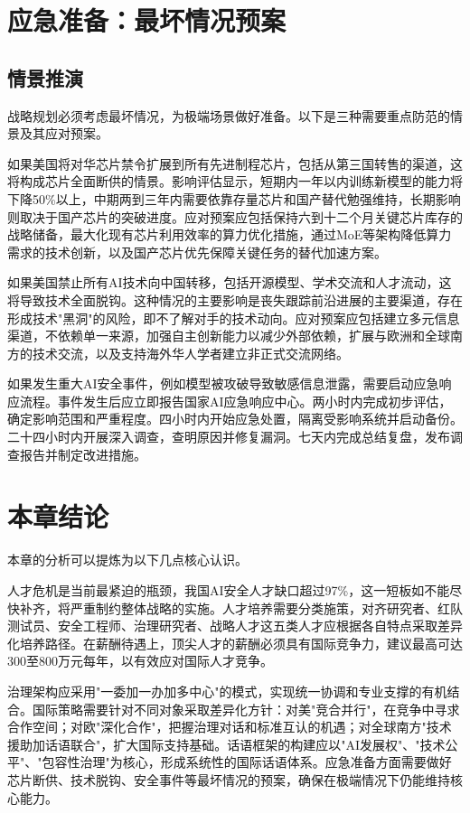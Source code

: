 \section{应急准备：最坏情况预案}

\subsection{情景推演}

战略规划必须考虑最坏情况，为极端场景做好准备。以下是三种需要重点防范的情景及其应对预案。

如果美国将对华芯片禁令扩展到所有先进制程芯片，包括从第三国转售的渠道，这将构成芯片全面断供的情景。影响评估显示，短期内一年以内训练新模型的能力将下降50\%以上，中期两到三年内需要依靠存量芯片和国产替代勉强维持，长期影响则取决于国产芯片的突破进度。应对预案应包括保持六到十二个月关键芯片库存的战略储备，最大化现有芯片利用效率的算力优化措施，通过MoE等架构降低算力需求的技术创新，以及国产芯片优先保障关键任务的替代加速方案。

如果美国禁止所有AI技术向中国转移，包括开源模型、学术交流和人才流动，这将导致技术全面脱钩。这种情况的主要影响是丧失跟踪前沿进展的主要渠道，存在形成技术"黑洞"的风险，即不了解对手的技术动向。应对预案应包括建立多元信息渠道，不依赖单一来源，加强自主创新能力以减少外部依赖，扩展与欧洲和全球南方的技术交流，以及支持海外华人学者建立非正式交流网络。

如果发生重大AI安全事件，例如模型被攻破导致敏感信息泄露，需要启动应急响应流程。事件发生后应立即报告国家AI应急响应中心。两小时内完成初步评估，确定影响范围和严重程度。四小时内开始应急处置，隔离受影响系统并启动备份。二十四小时内开展深入调查，查明原因并修复漏洞。七天内完成总结复盘，发布调查报告并制定改进措施。

\section{本章结论}

本章的分析可以提炼为以下几点核心认识。

人才危机是当前最紧迫的瓶颈，我国AI安全人才缺口超过97\%，这一短板如不能尽快补齐，将严重制约整体战略的实施。人才培养需要分类施策，对齐研究者、红队测试员、安全工程师、治理研究者、战略人才这五类人才应根据各自特点采取差异化培养路径。在薪酬待遇上，顶尖人才的薪酬必须具有国际竞争力，建议最高可达300至800万元每年，以有效应对国际人才竞争。

治理架构应采用"一委加一办加多中心"的模式，实现统一协调和专业支撑的有机结合。国际策略需要针对不同对象采取差异化方针：对美"竞合并行"，在竞争中寻求合作空间；对欧"深化合作"，把握治理对话和标准互认的机遇；对全球南方"技术援助加话语联合"，扩大国际支持基础。话语框架的构建应以"AI发展权"、"技术公平"、"包容性治理"为核心，形成系统性的国际话语体系。应急准备方面需要做好芯片断供、技术脱钩、安全事件等最坏情况的预案，确保在极端情况下仍能维持核心能力。

